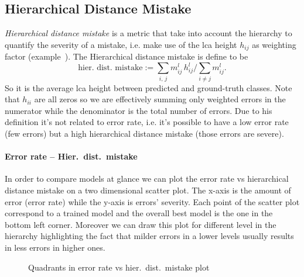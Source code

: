 \subsection{Hierarchical Distance Mistake}
\label{subsec:hierarchical-distance-mistake}
\emph{Hierarchical distance mistake} is a metric that take into account the
hierarchy to quantify the severity of a mistake, i.e. make use of the
\acrshort{lca} height $h_{ij}$ as weighting factor
(example~). The Hierarchical distance mistake is
define to be
\begin{equation}
  \textrm{hier.\ dist.\ mistake} :=
  \sum_{i, \, j} m_{ij}^l \, h_{ij}^l \bigg/ \sum_{i \ne j} m_{ij}^l.
  \label{eq:hierarchical-distance-mistake}
\end{equation}
So it is the average \acrshort{lca} height between predicted and ground-truth
classes. Note that $h_{ii}$ are all zeros so we are effectively summing only
weighted errors in the numerator while the denominator is the total number of
errors. Due to his definition it's not related to error rate, i.e. it's possible
to have a low error rate (few errors) but a high hierarchical distance mistake
(those errors are severe).

\paragraph{Error rate -- Hier.\ dist.\ mistake}
\label{par:error-rate-hier-dist-mistake}
In order to compare models at glance we can plot the error rate vs hierarchical
distance mistake on a two dimensional scatter plot. The x-axis is the
amount of error (error rate) while the y-axis is errors' severity. Each point of
the scatter plot correspond to a trained model and the overall best model is the
one in the bottom left corner. Moreover we can draw this plot for different
level in the hierarchy highlighting the fact that milder errors in a lower
levels usually results in less errors in higher ones.
\begin{figure}[htbp]
  \caption{Quadrants in error rate vs hier.\ dist.\ mistake plot}
  \label{fig:error-rate-hier-dist-mistake}
\end{figure}

